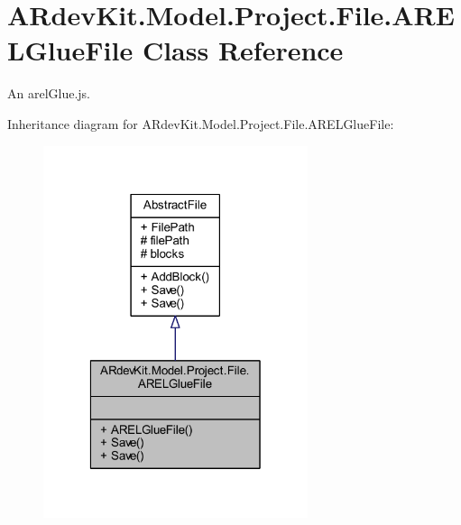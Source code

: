 \hypertarget{class_a_rdev_kit_1_1_model_1_1_project_1_1_file_1_1_a_r_e_l_glue_file}{\section{A\-Rdev\-Kit.\-Model.\-Project.\-File.\-A\-R\-E\-L\-Glue\-File Class Reference}
\label{class_a_rdev_kit_1_1_model_1_1_project_1_1_file_1_1_a_r_e_l_glue_file}
}


An arel\-Glue.\-js.  




Inheritance diagram for A\-Rdev\-Kit.\-Model.\-Project.\-File.\-A\-R\-E\-L\-Glue\-File\-:
\nopagebreak
\begin{figure}[H]
\begin{center}
\leavevmode
\includegraphics[width=220pt]{class_a_rdev_kit_1_1_model_1_1_project_1_1_file_1_1_a_r_e_l_glue_file__inherit__graph}
\end{center}
\end{figure}



